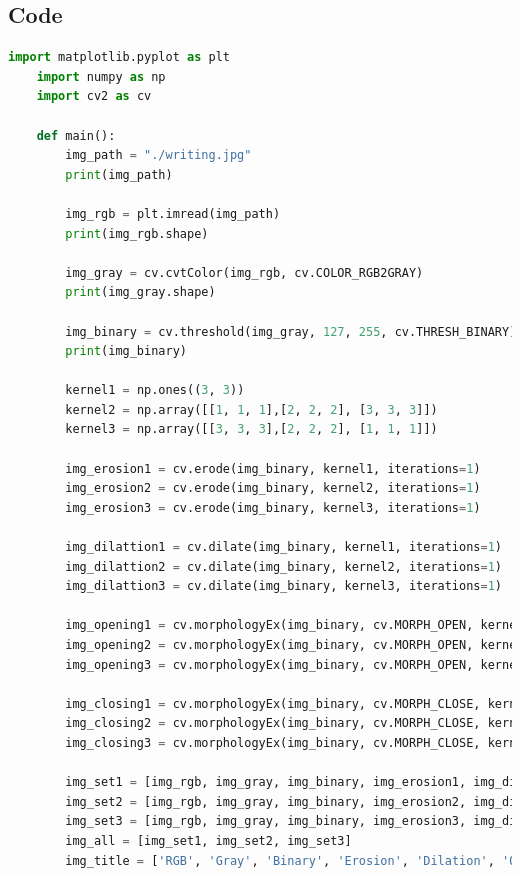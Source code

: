 \documentclass{article}
\begin{document}
{    \subsection{Code}
    \lstset{style=mystyle}
    \begin{lstlisting}[language=Python, caption=Code for performing morphological operations in a binary image]
    import matplotlib.pyplot as plt
    import numpy as np
    import cv2 as cv
    
    def main():
        img_path = "./writing.jpg"
        print(img_path)
    
        img_rgb = plt.imread(img_path)
        print(img_rgb.shape)
    
        img_gray = cv.cvtColor(img_rgb, cv.COLOR_RGB2GRAY)
        print(img_gray.shape)
    
        img_binary = cv.threshold(img_gray, 127, 255, cv.THRESH_BINARY)[1]
        print(img_binary)
    
        kernel1 = np.ones((3, 3))
        kernel2 = np.array([[1, 1, 1],[2, 2, 2], [3, 3, 3]])
        kernel3 = np.array([[3, 3, 3],[2, 2, 2], [1, 1, 1]])
    
        img_erosion1 = cv.erode(img_binary, kernel1, iterations=1)
        img_erosion2 = cv.erode(img_binary, kernel2, iterations=1)
        img_erosion3 = cv.erode(img_binary, kernel3, iterations=1)
    
        img_dilattion1 = cv.dilate(img_binary, kernel1, iterations=1)
        img_dilattion2 = cv.dilate(img_binary, kernel2, iterations=1)
        img_dilattion3 = cv.dilate(img_binary, kernel3, iterations=1)
    
        img_opening1 = cv.morphologyEx(img_binary, cv.MORPH_OPEN, kernel1)
        img_opening2 = cv.morphologyEx(img_binary, cv.MORPH_OPEN, kernel2)
        img_opening3 = cv.morphologyEx(img_binary, cv.MORPH_OPEN, kernel3)
        
        img_closing1 = cv.morphologyEx(img_binary, cv.MORPH_CLOSE, kernel1)
        img_closing2 = cv.morphologyEx(img_binary, cv.MORPH_CLOSE, kernel2)
        img_closing3 = cv.morphologyEx(img_binary, cv.MORPH_CLOSE, kernel3)
    
        img_set1 = [img_rgb, img_gray, img_binary, img_erosion1, img_dilattion1, img_opening1, img_closing1]
        img_set2 = [img_rgb, img_gray, img_binary, img_erosion2, img_dilattion2, img_opening2, img_closing2]
        img_set3 = [img_rgb, img_gray, img_binary, img_erosion3, img_dilattion3, img_opening3, img_opening3]
        img_all = [img_set1, img_set2, img_set3]
        img_title = ['RGB', 'Gray', 'Binary', 'Erosion', 'Dilation', 'Opening', 'Closing']
        

\end{lstlisting}}
\end{document}
